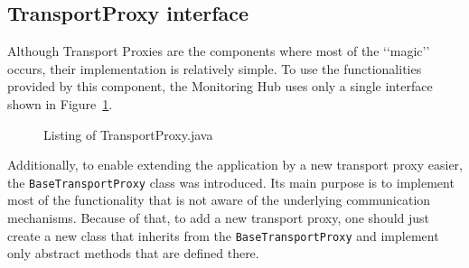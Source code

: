 \subsection{TransportProxy interface}
\label{subs:TransportProxyInterface}

Although Transport Proxies are the components where most of the \lq\lq{}magic\rq\rq{} occurs, their implementation is relatively simple. To use the functionalities provided by this component, the Monitoring Hub uses only a single interface shown in Figure~\ref{fig:transport_proxy}.

\begin{figure}[ht]
  \centering
  
  \caption{Listing of TransportProxy.java}
  \label{fig:transport_proxy}
\end{figure} 

Additionally, to enable extending the application by a new transport proxy easier, the \texttt{BaseTransportProxy} class was introduced. Its main purpose is to implement most of the functionality that is not aware of the underlying communication mechanisms. Because of that, to add a new transport proxy, one should just create a new class that inherits from the \texttt{BaseTransportProxy} and implement only abstract methods that are defined there.
